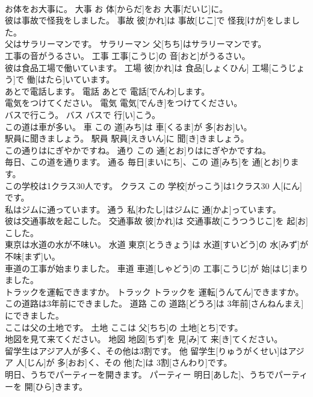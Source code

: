 \documentclass[8pt]{extreport}
\begin{document}
\begin{CJK}{UTF8}{min}
\\	お体をお大事に。	大事	お 体[からだ]をお 大事[だいじ]に。	
\\	彼は事故で怪我をしました。	事故	彼[かれ]は 事故[じこ]で 怪我[けが]をしました。	
\\	父はサラリーマンです。	サラリーマン	父[ちち]はサラリーマンです。	
\\	工事の音がうるさい。	工事	工事[こうじ]の 音[おと]がうるさい。	
\\	彼は食品工場で働いています。	工場	彼[かれ]は 食品[しょくひん] 工場[こうじょう]で 働[はたら]いています。	
\\	あとで電話します。	電話	あとで 電話[でんわ]します。	
\\	電気をつけてください。	電気	電気[でんき]をつけてください。	
\\	バスで行こう。	バス	バスで 行[い]こう。	
\\	この道は車が多い。	車	この 道[みち]は 車[くるま]が 多[おお]い。	
\\	駅員に聞きましょう。	駅員	駅員[えきいん]に 聞[き]きましょう。	
\\	この通りはにぎやかですね。	通り	この 通[とお]りはにぎやかですね。	
\\	毎日、この道を通ります。	通る	毎日[まいにち]、この 道[みち]を 通[とお]ります。	
\\	この学校は1クラス30人です。	クラス	この 学校[がっこう]は1クラス30 人[にん]です。	
\\	私はジムに通っています。	通う	私[わたし]はジムに 通[かよ]っています。	
\\	彼は交通事故を起こした。	交通事故	彼[かれ]は 交通事故[こうつうじこ]を 起[お]こした。	
\\	東京は水道の水が不味い。	水道	東京[とうきょう]は 水道[すいどう]の 水[みず]が 不味[まず]い。	
\\	車道の工事が始まりました。	車道	車道[しゃどう]の 工事[こうじ]が 始[はじ]まりました。	
\\	トラックを運転できますか。	トラック	トラックを 運転[うんてん]できますか。	
\\	この道路は3年前にできました。	道路	この 道路[どうろ]は 3年前[さんねんまえ]にできました。	
\\	ここは父の土地です。	土地	ここは 父[ちち]の 土地[とち]です。	
\\	地図を見て来てください。	地図	地図[ちず]を 見[み]て 来[き]てください。	
\\	留学生はアジア人が多く、その他は3割です。	他	留学生[りゅうがくせい]はアジア 人[じん]が 多[おお]く、その 他[た]は 3割[さんわり]です。	
\\	明日、うちでパーティーを開きます。	パーティー	明日[あした]、うちでパーティーを 開[ひら]きます。	

\end{CJK}
\end{document}
